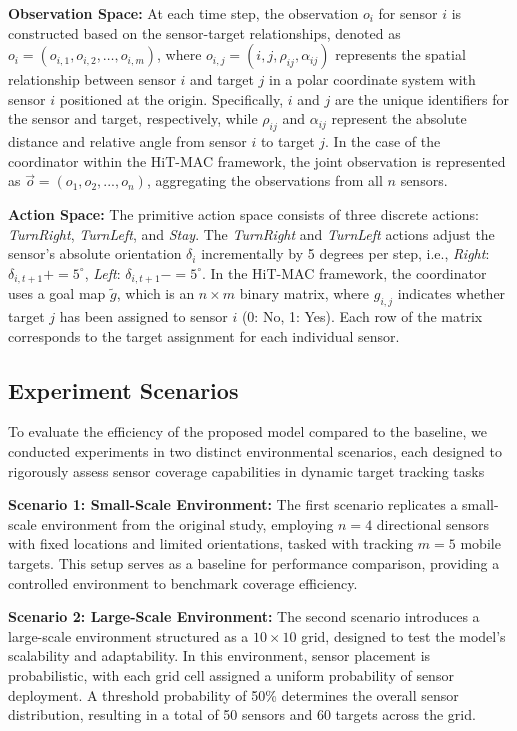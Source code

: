 \documentclass[preprint,12pt]{elsarticle}
\begin{document}
\textbf{Observation Space:} At each time step, the observation $o_i$ for sensor $i$ is constructed based on the sensor-target relationships, denoted as $o_i = (o_{i,1}, o_{i,2}, \dots, o_{i,m})$, where $o_{i,j} = (i, j, \rho_{ij}, \alpha_{ij})$ represents the spatial relationship between sensor $i$ and target $j$ in a polar coordinate system with sensor $i$ positioned at the origin. Specifically, $i$ and $j$ are the unique identifiers for the sensor and target, respectively, while $\rho_{ij}$ and $\alpha_{ij}$ represent the absolute distance and relative angle from sensor $i$ to target $j$. In the case of the coordinator within the HiT-MAC framework, the joint observation is represented as $\overset{\rightarrow}{o} = (o_1, o_2, ..., o_n)$, aggregating the observations from all $n$ sensors.

\textbf{Action Space:} The primitive action space consists of three discrete actions: \textit{TurnRight}, \textit{TurnLeft}, and \textit{Stay}. The \textit{TurnRight} and \textit{TurnLeft} actions adjust the sensor's absolute orientation $\delta_i$ incrementally by 5 degrees per step, i.e., \textit{Right}: $\delta_{i,t+1} += 5^\circ$, \textit{Left}: $\delta_{i,t+1} -= 5^\circ$. In the HiT-MAC framework, the coordinator uses a goal map $\tilde{g}$, which is an $n \times m$ binary matrix, where $g_{i,j}$ indicates whether target $j$ has been assigned to sensor $i$ (0: No, 1: Yes). Each row of the matrix corresponds to the target assignment for each individual sensor.
\subsection{Experiment Scenarios}
To evaluate the efficiency of the proposed model compared to the baseline, we conducted experiments in two distinct environmental scenarios, each designed to rigorously assess sensor coverage capabilities in dynamic target tracking tasks

\textbf{Scenario 1: Small-Scale Environment:} The first scenario replicates a small-scale environment from the original study, employing $n = 4$ directional sensors with fixed locations and limited orientations, tasked with tracking $m = 5$ mobile targets. This setup serves as a baseline for performance comparison, providing a controlled environment to benchmark coverage efficiency.

\textbf{Scenario 2: Large-Scale Environment:} The second scenario introduces a large-scale environment structured as a $10 \times 10$ grid, designed to test the model’s scalability and adaptability. In this environment, sensor placement is probabilistic, with each grid cell assigned a uniform probability of sensor deployment. A threshold probability of 50\% determines the overall sensor distribution, resulting in a total of 50 sensors and 60 targets across the grid.
\end{document}
